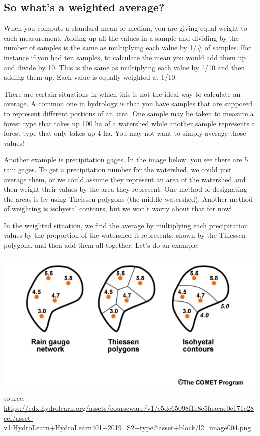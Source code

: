 \documentclass[
]{book}
\begin{document}
\hypertarget{so-whats-a-weighted-average}{%
\subsection{So what's a weighted average?}\label{so-whats-a-weighted-average}}

When you compute a standard mean or median, you are giving equal weight to each measurement. Adding up all the values in a sample and dividing by the number of samples is the same as multiplying each value by 1/\# of samples. For instance if you had ten samples, to calculate the mean you would add them up and divide by 10. This is the same as multiplying each value by 1/10 and then adding them up. Each value is equally weighted at 1/10.

There are certain situations in which this is not the ideal way to calculate an average. A common one in hydrology is that you have samples that are supposed to represent different portions of an area. One sample may be taken to measure a forest type that takes up 100 ha of a watershed while another sample represents a forest type that only takes up 4 ha. You may not want to simply average those values!

Another example is precipitation gages. In the image below, you see there are 5 rain gages. To get a precipitation number for the watershed, we could just average them, or we could assume they represent an area of the watershed and then weight their values by the area they represent. One method of designating the areas is by using Theissen polygons (the middle watershed). Another method of weighting is isohyetal contours, but we won't worry about that for now!

In the weighted situation, we find the average by multiplying each precipitation values by the proportion of the watershed it represents, shown by the Thiessen polygons, and then add them all together. Let's do an example.

\includegraphics{images/theissen.png}source: \url{https://edx.hydrolearn.org/assets/courseware/v1/e5dc65098f1e8c5faacae0e171e28ccf/asset-v1:HydroLearn+HydroLearn401+2019_S2+type@asset+block/l2_image004.png}
\end{document}
